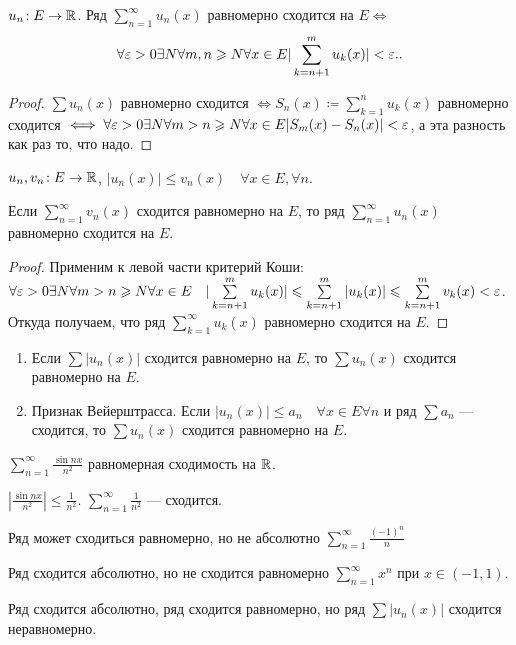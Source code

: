 \begin{theorem}
    $u_n\!: E \to \mathbb{R}$. Ряд  $\sum\limits_{n=1}^\infty u_n(x)$ равномерно сходится на  $E \iff$
     \[
    \forall \varepsilon > 0 \exists N \forall m, n \geqslant N \forall x \in E |\sum\limits_{k=n+1}^m u_k(x)| < \varepsilon.
    .\] 
\end{theorem}
\begin{proof}
    $\sum u_n(x)$ равномерно сходится  $\iff S_n(x) \coloneqq \sum\limits_{k=1}^n u_k(x)$ равномерно сходится  $\iff \forall \varepsilon > 0 \exists N \forall m > n \geqslant N \forall x \in E |S_m(x) - S_n(x)| < \varepsilon$, а эта разность как раз то, что надо.
\end{proof}

\begin{theorem}
   $u_n, v_n\!: E \to \mathbb{R}$,  $|u_n(x)| \le v_n(x) \quad \forall x \in E, \forall n$.

   Если $\sum\limits_{n=1}^\infty v_n(x)$ сходится равномерно на  $E$, то ряд  $\sum\limits_{n=1}^\infty u_n(x)$ равномерно сходится на  $E$.
\end{theorem}
\begin{proof}
    Применим к левой части критерий Коши: $\forall \varepsilon > 0 \exists N \forall m > n \geqslant N \forall x \in E \quad |\sum\limits_{k=n+1}^m u_k(x)| \leqslant \sum\limits_{k=n+1}^m |u_k(x)|\leqslant \sum\limits_{k=n+1}^m v_k(x)< \varepsilon$. Откуда получаем, что ряд $\sum\limits_{k=1}^\infty u_k(x) $ равномерно сходится на  $E$.
\end{proof}
\begin{consequence}
    \begin{enumerate}
        \item Если $\sum |u_n(x)|$ сходится равномерно на  $E$, то  $\sum u_n(x)$ сходится равномерно на  $E$. 
        \item Признак Вейерштрасса. Если  $|u_n(x)| \le a_n \quad \forall x \in E \forall n$ и ряд $\sum a_n$ --- сходится, то  $\sum u_n(x)$ сходится равномерно на  $E$.
    \end{enumerate}
\end{consequence}
\begin{example}
    $\sum\limits_{n=1}^\infty \frac{\sin nx}{n^2}$ равномерная сходимость на $\mathbb{R}$.

     $\left| \frac{\sin nx}{n^2}\right| \le \frac{1}{n^2}$. $\sum\limits_{n=1}^\infty \frac{1}{n^2}$ --- сходится.
\end{example}
\begin{remark}
    Ряд может сходиться равномерно, но не абсолютно $\sum\limits_{n=1}^\infty \frac{(-1)^n}{n}$

    Ряд сходится абсолютно, но не сходится равномерно $\sum\limits_{n=1}^\infty x^n$ при $x \in (-1, 1)$.

    Ряд сходится абсолютно, ряд сходится равномерно, но ряд $\sum |u_n(x)|$ сходится неравномерно.
\end{remark}

